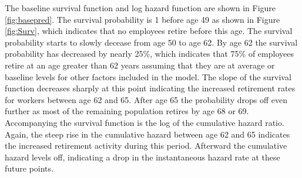 \documentclass[12pt,letterpaper]{article}
\begin{document}
The baseline survival function and log hazard function are shown in Figure \ref{fig:basepred}. The survival probability is 1 before age 49 as shown in Figure \ref{fig:Surv}, which indicates that no employees retire before this age. The survival probability starts to slowly decease from age 50 to age 62. By age 62 the survival probability has decreased by nearly 25\%, which indicates that 75\% of employees retire at an age greater than 62 years assuming that they are at average or baseline levels for other factors included in the model.  The slope of the survival function decreases sharply at this point indicating the increased retirement rates for workers between age 62 and 65.  After age 65 the probability drops off even further as most of the remaining population retires by age 68 or 69. Accompanying the survival function is the log of the cumulative hazard ratio.  Again, the steep rise in the cumulative hazard between age 62 and 65 indicates the increased retirement activity during this period.  Afterward the cumulative hazard levels off, indicating a drop in the instantaneous hazard rate at these future points.
\end{document}
